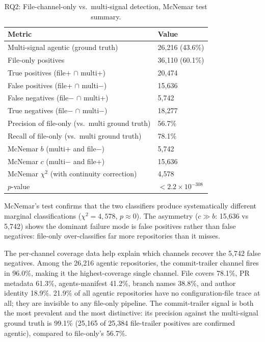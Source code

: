 \begin{table}[h]
\centering
\caption{RQ2: File-channel-only vs.\ multi-signal detection, McNemar test summary.}
\label{tab:rq2}
\begin{tabular}{@{}ll@{}}
\toprule
Metric & Value \\
\midrule
Multi-signal agentic (ground truth)             & 26,216 (43.6\%) \\
File-only positives                             & 36,110 (60.1\%) \\
True positives (file+ $\cap$ multi+)            & 20,474 \\
False positives (file+ $\cap$ multi$-$)         & 15,636 \\
False negatives (file$-$ $\cap$ multi+)         & 5,742 \\
True negatives (file$-$ $\cap$ multi$-$)        & 18,277 \\
Precision of file-only (vs.\ multi ground truth)& 56.7\% \\
Recall of file-only (vs.\ multi ground truth)   & 78.1\% \\
McNemar $b$ (multi+ and file$-$)                & 5,742 \\
McNemar $c$ (multi$-$ and file+)                & 15,636 \\
McNemar $\chi^2$ (with continuity correction)   & 4,578 \\
$p$-value                                       & $<\!2.2 \times 10^{-308}$ \\
\bottomrule
\end{tabular}
\end{table}

McNemar's test confirms that the two classifiers produce systematically different marginal classifications ($\chi^2 = 4{,}578$, $p \approx 0$). The asymmetry ($c \gg b$: 15,636 vs 5,742) shows the dominant failure mode is false positives rather than false negatives: file-only over-classifies far more repositories than it misses.

The per-channel coverage data help explain which channels recover the 5,742 false negatives. Among the 26,216 agentic repositories, the commit-trailer channel fires in 96.0\%, making it the highest-coverage single channel. File covers 78.1\%, PR metadata 61.3\%, agents-manifest 41.2\%, branch names 38.8\%, and author identity 18.9\%. 21.9\% of all agentic repositories have no configuration-file trace at all; they are invisible to any file-only pipeline. The commit-trailer signal is both the most prevalent and the most distinctive: its precision against the multi-signal ground truth is 99.1\% (25,165 of 25,384 file-trailer positives are confirmed agentic), compared to file-only's 56.7\%.

